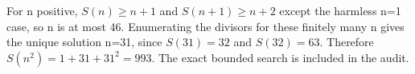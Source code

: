 For n positive, $S(n)\ge n+1$ and $S(n+1)\ge n+2$ except the harmless n=1 case, so n is at most 46. Enumerating the divisors for these finitely many n gives the unique solution n=31, since $S(31)=32$ and $S(32)=63$. Therefore $S(n^2)=1+31+31^2=\boxed{993}$. The exact bounded search is included in the audit.

